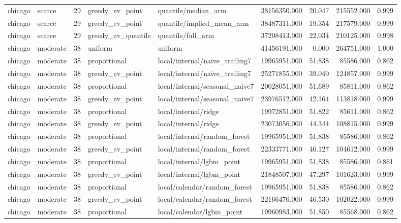 \begin{tabular}{llrllrrrr}
chicago & scarce & 29 & greedy\_ev\_point & quantile/median\_arm & 38156350.000 & 20.047 & 215552.000 & 0.999 \\
chicago & scarce & 29 & greedy\_ev\_point & quantile/implied\_mean\_arm & 38487311.000 & 19.354 & 217579.000 & 0.999 \\
chicago & scarce & 29 & greedy\_ev\_quantile & quantile/full\_arm & 37208413.000 & 22.034 & 210125.000 & 0.998 \\
chicago & moderate & 38 & uniform & uniform & 41456191.000 & 0.000 & 264751.000 & 1.000 \\
chicago & moderate & 38 & proportional & local/internal/naive\_trailing7 & 19965951.000 & 51.838 & 85586.000 & 0.862 \\
chicago & moderate & 38 & greedy\_ev\_point & local/internal/naive\_trailing7 & 25271855.000 & 39.040 & 124857.000 & 0.999 \\
chicago & moderate & 38 & proportional & local/internal/seasonal\_naive7 & 20028051.000 & 51.689 & 85811.000 & 0.862 \\
chicago & moderate & 38 & greedy\_ev\_point & local/internal/seasonal\_naive7 & 23976512.000 & 42.164 & 113818.000 & 0.999 \\
chicago & moderate & 38 & proportional & local/internal/ridge & 19972851.000 & 51.822 & 85611.000 & 0.862 \\
chicago & moderate & 38 & greedy\_ev\_point & local/internal/ridge & 23073056.000 & 44.344 & 108815.000 & 0.999 \\
chicago & moderate & 38 & proportional & local/internal/random\_forest & 19965951.000 & 51.838 & 85586.000 & 0.862 \\
chicago & moderate & 38 & greedy\_ev\_point & local/internal/random\_forest & 22333771.000 & 46.127 & 104612.000 & 0.999 \\
chicago & moderate & 38 & proportional & local/internal/lgbm\_point & 19965951.000 & 51.838 & 85586.000 & 0.861 \\
chicago & moderate & 38 & greedy\_ev\_point & local/internal/lgbm\_point & 21848507.000 & 47.297 & 101623.000 & 0.999 \\
chicago & moderate & 38 & proportional & local/calendar/random\_forest & 19965951.000 & 51.838 & 85586.000 & 0.862 \\
chicago & moderate & 38 & greedy\_ev\_point & local/calendar/random\_forest & 22166476.000 & 46.530 & 102022.000 & 0.999 \\
chicago & moderate & 38 & proportional & local/calendar/lgbm\_point & 19960983.000 & 51.850 & 85568.000 & 0.862 \\

\end{tabular}
